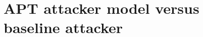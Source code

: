 \documentclass{cshonours}
\begin{document}
%
\section{APT attacker model versus baseline attacker}
\label{sec:attacker-in-operation}
\end{document}

